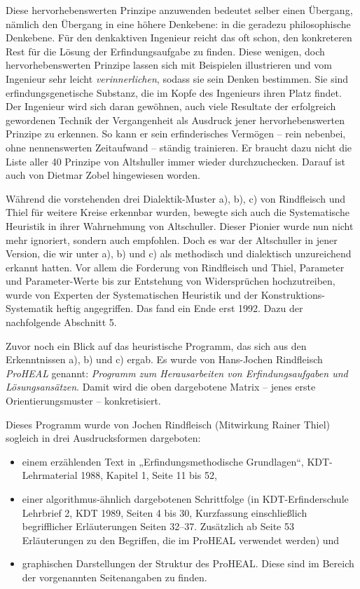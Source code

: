 \documentclass[12pt,a4paper]{article}
\begin{document}
Diese hervorhebenswerten Prinzipe anzuwenden bedeutet selber einen Übergang,
nämlich den Übergang in eine höhere Denkebene: in die geradezu philosophische
Denkebene. Für den denkaktiven Ingenieur reicht das oft schon, den konkreteren
Rest für die Lösung der Erfindungsaufgabe zu finden.  Diese wenigen, doch
hervorhebenswerten Prinzipe lassen sich mit Beispielen illustrieren und vom
Ingenieur sehr leicht \emph{verinnerlichen}, sodass sie sein Denken bestimmen.
Sie sind erfindungsgenetische Substanz, die im Kopfe des Ingenieurs ihren Platz
findet. Der Ingenieur wird sich daran gewöhnen, auch viele Resultate der
erfolgreich gewordenen Technik der Vergangenheit als Ausdruck jener
hervorhebenswerten Prinzipe zu erkennen. So kann er sein erfinderisches
Vermögen – rein nebenbei, ohne nennenswerten Zeitaufwand – ständig
trainieren. Er braucht dazu nicht die Liste aller 40 Prinzipe von Altshuller
immer wieder durchzuchecken. Darauf ist auch von Dietmar Zobel hingewiesen
worden.

Während die vorstehenden drei Dialektik-Muster a), b), c) von Rindfleisch und
Thiel für weitere Kreise erkennbar wurden, bewegte sich auch die Systematische
Heuristik in ihrer Wahrnehmung von Altschuller. Dieser Pionier wurde nun nicht
mehr ignoriert, sondern auch empfohlen. Doch es war der Altschuller in jener
Version, die wir unter a), b) und c) als methodisch und dialektisch
unzureichend erkannt hatten. Vor allem die Forderung von Rindfleisch und Thiel,
Parameter und Parameter-Werte bis zur Entstehung von Widersprüchen
hochzutreiben, wurde von Experten der Systematischen Heuristik und der
Konstruktions-Systematik heftig angegriffen. Das fand ein Ende erst 1992. Dazu
der nachfolgende Abschnitt 5.

Zuvor noch ein Blick auf das heuristische Programm, das sich aus den
Erkenntnissen a), b) und c) ergab. Es wurde von Hans-Jochen Rindfleisch
\emph{ProHEAL} genannt: \emph{Programm zum Herausarbeiten von
  Erfindungsaufgaben und Lösungsansätzen}. Damit wird die oben dargebotene
Matrix – jenes erste Orientierungsmuster – konkretisiert.

Dieses Programm wurde von Jochen Rindfleisch (Mitwirkung Rainer Thiel) sogleich
in drei Ausdrucksformen dargeboten:
\begin{itemize}\itemsep0pt
\item einem erzählenden Text in „Erfindungsmethodische Grundlagen“,
  KDT-Lehrmaterial 1988, Kapitel 1, Seite 11 bis 52,
\item einer algorithmus-ähnlich dargebotenen Schrittfolge (in
  KDT-Erfinderschule Lehrbrief 2, KDT 1989, Seiten 4 bis 30, Kurzfassung
  einschließlich begrifflicher Erläuterungen Seiten 32–37. Zusätzlich ab Seite
  53 Erläuterungen zu den Begriffen, die im ProHEAL verwendet werden) und
\item graphischen Darstellungen der Struktur des ProHEAL. Diese sind im Bereich
  der vorgenannten Seitenangaben zu finden.
\end{itemize}
\end{document}
